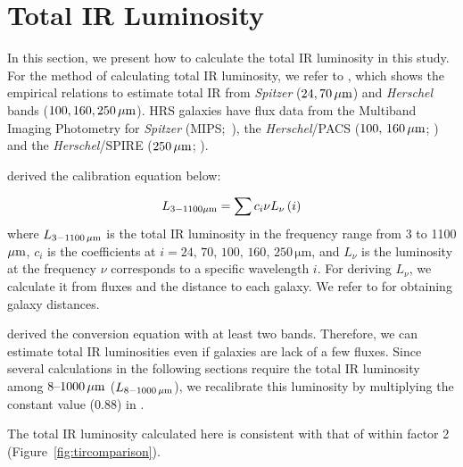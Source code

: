\section{Total IR Luminosity}\label{sec:tirluminosity}
In this section, we present how to calculate the total IR luminosity in this study.
For the method of calculating total IR luminosity, we refer to \citet{Galametz2013}, which shows the empirical relations to estimate total IR from {\it Spitzer\/} ($24, 70\,\mathrm{\mu m}$) and {\it Herschel\/} bands ($100, 160, 250\,\mathrm{\mu m}$).
HRS galaxies have flux data from the Multiband Imaging Photometry for {\it Spitzer\/} (MIPS;~\citealt{Rieke2004, Bendo2012}), the {\it Herschel\/}/PACS ($100,\,160\,\mathrm{\mu m}$; \citealt{Cortese2014c}) and the {\it Herschel\/}/SPIRE ($250\,\mathrm{\mu m}$; \citealt{Ciesla2012a}).

\citet{Galametz2013} derived the calibration equation below:

\begin{equation}\label{eq:galametz}
    L_{\mathrm{3-1100\mathrm{\mu m}}} = \sum c_i \nu L_{\nu}\left(i\right)
\end{equation}
where $L_{\mathrm{3-1100\,\mu m}}$ is the total IR luminosity in the frequency range from 3 to 1100 $\mathrm{\mu m}$, $c_i$ is the coefficients at $i = 24,\,70,\,100,\,160,\,250\,\mathrm{\mu m}$, and $L_{\nu}$ is the luminosity at the frequency $\nu$ corresponds to a specific wavelength $i$.
For deriving $L_{\nu}$, we calculate it from fluxes and the distance to each galaxy.
We refer to \citet{Cortese2012} for obtaining galaxy distances.

\citet{Galametz2013} derived the conversion equation with at least two bands.
Therefore, we can estimate total IR luminosities even if galaxies are lack of a few fluxes.
Since several calculations in the following sections require the total IR luminosity among $8 \mbox{--} 1000\,\mathrm{\mu m}$ ($L_{\mathrm{8-1000\,\mathrm{\mu m}}}$), we recalibrate this luminosity by multiplying the constant value (0.88) in \citet{Takeuchi2005}.

The total IR luminosity calculated here is consistent with that of \citet{Ciesla2014} within factor 2 (Figure~\ref{fig:tircomparison}).

